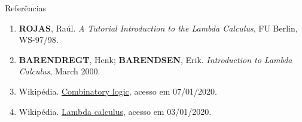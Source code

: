 \begin{frame}[fragile]{Referências}

    \begin{enumerate}
        \item \textbf{ROJAS}, Raúl. \textit{A Tutorial Introduction to the Lambda Calculus},
            FU Berlin, WS-97/98.
  
        \item \textbf{BARENDREGT}, Henk; \textbf{BARENDSEN}, Erik. \textit{Introduction to 
            Lambda Calculus}, March 2000.

        \item Wikipédia. \href{https://en.wikipedia.org/wiki/Combinatory_logic}{Combinatory logic},
            acesso em 07/01/2020.

        \item Wikipédia. \href{https://en.wikipedia.org/wiki/Lambda_calculus}{Lambda calculus},
            acesso em 03/01/2020. 

    \end{enumerate}

\end{frame}

